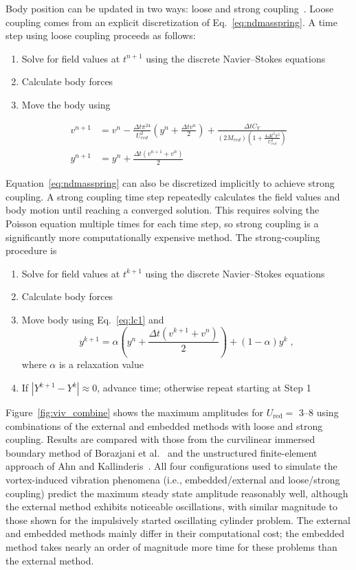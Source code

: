 \documentclass[preprint,12pt]{elsarticle}
\begin{document}
Body position can be updated in two ways: loose and strong coupling~\cite{Sotiropoulos:2014gv}.
Loose coupling comes from an explicit discretization of Eq.~\eqref{eq:ndmasspring}.
A time step using loose coupling proceeds as follows:
\begin{enumerate}
    \item Solve for field values at $t^{n+1}$ using the discrete Navier--Stokes equations
    \item Calculate body forces
    \item Move the body using
\end{enumerate}
\begin{align}
v^{n+1} &= v^n-\frac{\Delta t\pi^24}{U_{red}^2}\left(y^n+\frac{\Delta tv^n}{2}\right) + \frac{\Delta tC_Y}{\left(2M_{red}\right)\left(1+\frac{4\Delta t^2\pi^2}{U_{red}^2}\right)} \label{eq:lc1} \\
y^{n+1} &= y^n +\frac{\Delta t\left(v^{n+1}+v^n\right)}{2}\; \label{eq:lc2}
\end{align}

Equation~\eqref{eq:ndmasspring} can also be discretized implicitly to achieve strong coupling.
A strong coupling time step repeatedly calculates the field values and body
motion until reaching a converged solution.
This requires solving the Poisson equation multiple times for each time step,
so strong coupling is a significantly more computationally expensive method.
The strong-coupling procedure is
\begin{enumerate}
    \item Solve for field values at $t^{k+1}$ using the discrete Navier--Stokes equations
    \item Calculate body forces
    \item Move body using Eq.~\eqref{eq:lc1} and
    \begin{equation}
        y^{k+1} = \alpha \left(y^n+\frac{\Delta t\left(v^{k+1}+v^n\right)}{2}\right) +\left(1-\alpha\right)y^k \;,
        \label{eq:sc}
    \end{equation}
    where $\alpha$ is a relaxation value\
    \item If $|Y^{k+1}-Y^k| \approx 0$, advance time; otherwise repeat starting at Step 1
\end{enumerate}

Figure~\ref{fig:viv_combine} shows the maximum amplitudes for $U_{\text{red}} = $ \numrange{3}{8} using combinations of the external and embedded methods with loose and strong coupling.
Results are compared with those from the curvilinear immersed boundary method of Borazjani
et al.~\cite{borazjani2008curvilinear} and the unstructured finite-element approach
of Ahn and Kallinderis~\cite{ahn2006strongly}.
All four configurations used to simulate the vortex-induced vibration phenomena
(i.e., embedded/external and loose/strong coupling) predict the maximum steady state
amplitude reasonably well, although the external method exhibits noticeable oscillations,
with similar magnitude to those shown for the impulsively started oscillating cylinder problem.
The external and embedded methods mainly differ in their computational cost;
the embedded method takes nearly an order of magnitude more time for these problems
than the external method.
\end{document}
